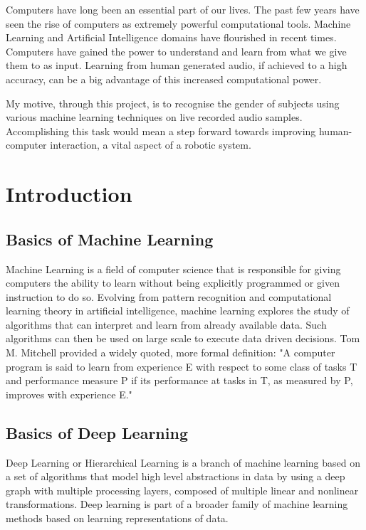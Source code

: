 \documentclass[12pt]{article}
\begin{document}
	\begin{justify}
		\textnormal{Computers have long been an essential part of our lives. The past few years have seen the rise of computers as extremely powerful computational tools. Machine Learning and Artificial Intelligence domains have flourished in recent times. Computers have gained the power to understand and learn from what we give them to as input. Learning from human generated audio, if achieved to a high accuracy, can be a big advantage of this increased computational power.}
	\end{justify}
	\begin{justify}
		\textnormal{My motive, through this project, is to recognise the gender of subjects using various machine learning techniques on live recorded audio samples. Accomplishing this task would mean a step forward towards improving human-computer interaction, a vital aspect of a robotic system.}
	\end{justify}
	
	\pagebreak
	\tableofcontents
	\pagebreak
	
	\pagebreak
	\section{Introduction}
		\subsection{Basics of Machine Learning}
		Machine Learning is a field of computer science that is responsible for giving computers the ability to learn without being explicitly programmed or given instruction to do so. Evolving from pattern recognition and computational learning theory in artificial intelligence, machine learning explores the study of algorithms that can interpret and learn from already available data. Such algorithms can then be used on  large scale to execute data driven decisions. Tom M. Mitchell provided a widely quoted, more formal definition: "A computer program is said to learn from experience E with respect to some class of tasks T and performance measure P if its performance at tasks in T, as measured by P, improves with experience E."
		\subsection{Basics of Deep Learning}
			\begin{justify}
				Deep Learning or Hierarchical Learning is a branch of machine learning based on a set of algorithms that model high level abstractions in data by using a deep graph with multiple processing layers, composed of multiple linear and nonlinear transformations. Deep learning is part of a broader family of machine learning methods based on learning representations of data.
			\end{justify}
			
\end{document}
